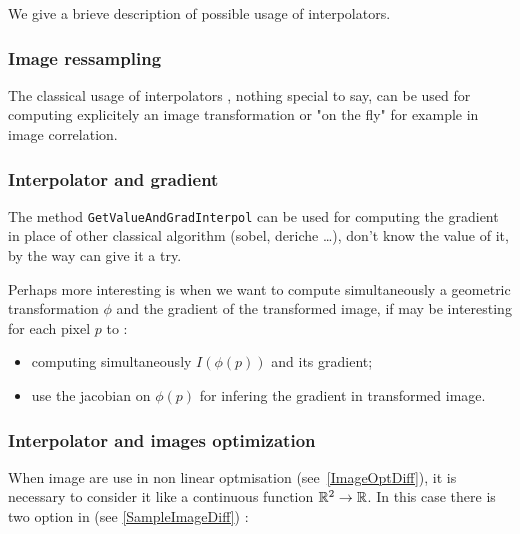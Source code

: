 We give a brieve description of possible usage of interpolators.


\subsubsection{Image ressampling}

The classical usage of interpolators , nothing special to say, can be used for computing explicitely 
an image transformation or "on the fly" for example in image correlation.


\subsubsection{Interpolator and gradient}

The method {\tt GetValueAndGradInterpol} can be used for computing the gradient in place
of other classical algorithm (sobel, deriche \dots), don't know the value of it, by the way
can give it a try.

Perhaps more interesting is when we want to compute simultaneously a geometric transformation $\phi$
and the gradient of the transformed image, if may be interesting for each pixel $p$ to :

\begin{itemize}
   \item computing simultaneously $I(\phi(p))$ and its gradient;
   \item use the jacobian on $\phi(p)$ for infering the gradient in transformed image.
\end{itemize}


\subsubsection{Interpolator and images optimization}

When image are use in non linear optmisation (see~\ref{ImageOptDiff}), it is necessary to consider it like a
continuous function $\mathbb{R}^2 \rightarrow \mathbb{R}$. In this case there is two option in
\PPP (see \ref{SampleImageDiff}) :

